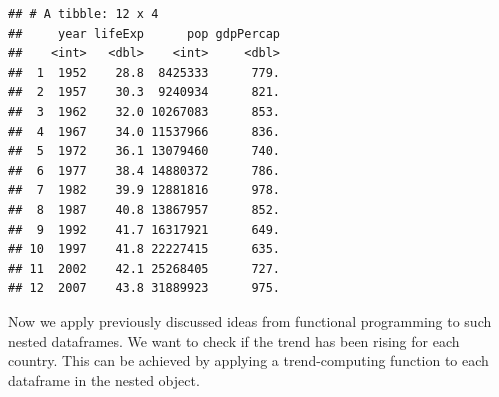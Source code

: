 \documentclass[12pt,]{article}
\newenvironment{Shaded}{\begin{snugshade}}{\end{snugshade}}
\newcommand{\KeywordTok}[1]{\textcolor[rgb]{0.13,0.29,0.53}{\textbf{#1}}}
\newcommand{\DataTypeTok}[1]{\textcolor[rgb]{0.13,0.29,0.53}{#1}}
\newcommand{\DecValTok}[1]{\textcolor[rgb]{0.00,0.00,0.81}{#1}}
\newcommand{\StringTok}[1]{\textcolor[rgb]{0.31,0.60,0.02}{#1}}
\newcommand{\CommentTok}[1]{\textcolor[rgb]{0.56,0.35,0.01}{\textit{#1}}}
\newcommand{\ControlFlowTok}[1]{\textcolor[rgb]{0.13,0.29,0.53}{\textbf{#1}}}
\newcommand{\OperatorTok}[1]{\textcolor[rgb]{0.81,0.36,0.00}{\textbf{#1}}}
\newcommand{\NormalTok}[1]{#1}
\begin{document}
\begin{Shaded}
\end{Shaded}

\begin{verbatim}
## # A tibble: 12 x 4
##     year lifeExp      pop gdpPercap
##    <int>   <dbl>    <int>     <dbl>
##  1  1952    28.8  8425333      779.
##  2  1957    30.3  9240934      821.
##  3  1962    32.0 10267083      853.
##  4  1967    34.0 11537966      836.
##  5  1972    36.1 13079460      740.
##  6  1977    38.4 14880372      786.
##  7  1982    39.9 12881816      978.
##  8  1987    40.8 13867957      852.
##  9  1992    41.7 16317921      649.
## 10  1997    41.8 22227415      635.
## 11  2002    42.1 25268405      727.
## 12  2007    43.8 31889923      975.
\end{verbatim}

Now we apply previously discussed ideas from functional programming to
such nested dataframes. We want to check if the trend has been rising
for each country. This can be achieved by applying a trend-computing
function to each dataframe in the nested object.

\begin{Shaded}
\end{Shaded}
\end{document}

